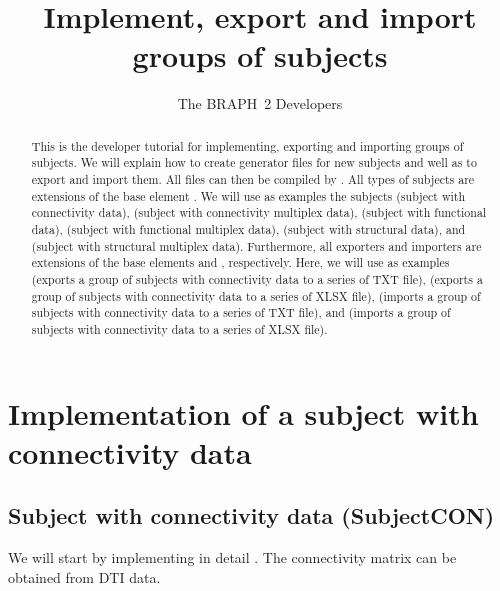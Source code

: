 \documentclass{tufte-handout}
\title{Implement, export and import groups of subjects}
\author[The BRAPH~2 Developers]{The BRAPH~2 Developers}
\begin{document}
\maketitle

\begin{abstract}
This is the developer tutorial for implementing, exporting and importing groups of subjects.
We will explain how to create generator files  for new subjects and well as to export and import them. All  files can then be compiled by . 
All types of subjects are extensions of the base element . 
We will use as examples the subjects  (subject with connectivity data),  (subject with connectivity multiplex data),  (subject with functional data),  (subject with functional multiplex data),  (subject with structural data), and  (subject with structural multiplex data). 
Furthermore, all exporters and importers are extensions of the base elements  and , respectively. Here, we will use as examples  (exports a group of subjects with connectivity data to a series of TXT file),  (exports a group of subjects with connectivity data to a series of XLSX file),  (imports a group of subjects with connectivity data to a series of TXT file), and  (imports a group of subjects with connectivity data to a series of XLSX file).

\end{abstract}

\tableofcontents

\clearpage
\section{Implementation of a subject with connectivity data}

\subsection{Subject with connectivity data (SubjectCON)}

We will start by implementing in detail . The connectivity matrix can be obtained from DTI data.
\end{document}
